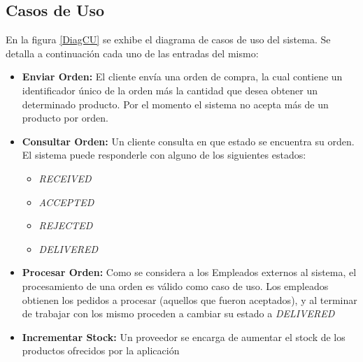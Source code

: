 \documentclass[a4paper,10pt]{article}
\begin{document}
    \subsection{Casos de Uso}
        En la figura \ref{DiagCU} se exhibe el diagrama de casos de uso del 
        sistema. Se detalla a continuación cada uno de las entradas del mismo:
        \begin{itemize}
            \item \textbf{Enviar Orden:} El cliente envía una orden de compra,
            la cual contiene un identificador único de la orden más la cantidad
            que desea obtener un determinado producto. Por el momento el 
            sistema no acepta más de un producto por orden.
            \item \textbf{Consultar Orden:} Un cliente consulta en que 
            estado se encuentra su orden. El sistema puede responderle con 
            alguno de los siguientes estados: 
            \begin{itemize}
                \item \textit{RECEIVED}
                \item \textit{ACCEPTED}
                \item \textit{REJECTED}
                \item \textit{DELIVERED}
            \end{itemize}
            \item \textbf{Procesar Orden:} Como se considera a los Empleados
            externos al sistema, el procesamiento de una orden es válido como
            caso de uso. Los empleados obtienen los pedidos a procesar 
            (aquellos que fueron aceptados), y al terminar de trabajar con los
            mismo proceden a cambiar su estado a \textit{DELIVERED}
            \item \textbf{Incrementar Stock:} Un proveedor se encarga de 
            aumentar el stock de los productos ofrecidos por la aplicación
        \end{itemize}
\end{document}
